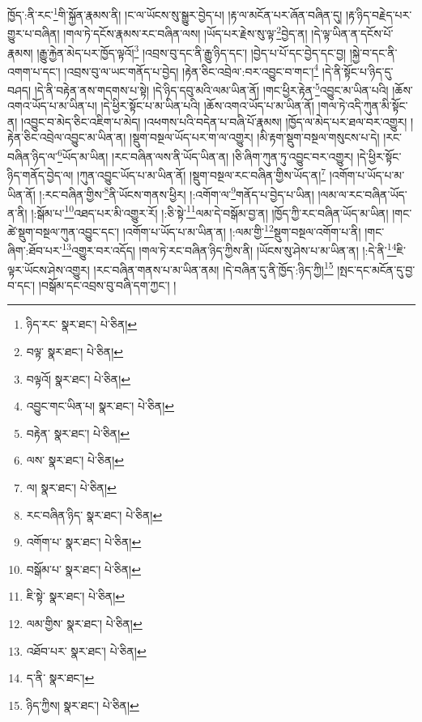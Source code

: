 ཁྱོད་:ནི་རང་\footnote{ཉིད་རང་  སྣར་ཐང་།  པེ་ཅིན། }གི་སྐྱོན་རྣམས་ནི། །ང་ལ་ཡོངས་སུ་སྒྱུར་བྱེད་པ། །རྟ་ལ་མངོན་པར་ཞོན་བཞིན་དུ། །རྟ་ཉིད་བརྗེད་པར་གྱུར་པ་བཞིན། །གལ་ཏེ་དངོས་རྣམས་རང་བཞིན་ལས། །ཡོད་པར་རྗེས་སུ་ལྟ་\footnote{བལྟ་  སྣར་ཐང་།  པེ་ཅིན། }བྱེད་ན། །དེ་ལྟ་ཡིན་ན་དངོས་པོ་རྣམས། །རྒྱུ་རྐྱེན་མེད་པར་ཁྱོད་ལྟའོ།\footnote{བལྟའོ།  སྣར་ཐང་།  པེ་ཅིན། } །འབྲས་བུ་དང་ནི་རྒྱུ་ཉིད་དང་། །བྱེད་པ་པོ་དང་བྱེད་དང་བྱ། །སྐྱེ་བ་དང་ནི་འགག་པ་དང་། །འབྲས་བུ་ལ་ཡང་གནོད་པ་བྱེད། །རྟེན་ཅིང་འབྲེལ་:བར་འབྱུང་བ་གང་།\footnote{འབྱུང་གང་ཡིན་པ།  སྣར་ཐང་།  པེ་ཅིན། } །དེ་ནི་སྟོང་པ་ཉིད་དུ་བཤད། །དེ་ནི་བརྟེན་ནས་གདགས་པ་སྟེ། །དེ་ཉིད་དབུ་མའི་ལམ་ཡིན་ནོ། །གང་ཕྱིར་རྟེན་\footnote{བརྟེན་  སྣར་ཐང་།  པེ་ཅིན། }འབྱུང་མ་ཡིན་པའི། །ཆོས་འགའ་ཡོད་པ་མ་ཡིན་པ། །དེ་ཕྱིར་སྟོང་པ་མ་ཡིན་པའི། །ཆོས་འགའ་ཡོད་པ་མ་ཡིན་ནོ། །གལ་ཏེ་འདི་ཀུན་མི་སྟོང་ན། །འབྱུང་བ་མེད་ཅིང་འཇིག་པ་མེད། །འཕགས་པའི་བདེན་པ་བཞི་པོ་རྣམས། །ཁྱོད་ལ་མེད་པར་ཐལ་བར་འགྱུར། །རྟེན་ཅིང་འབྲེལ་འབྱུང་མ་ཡིན་ན། །སྡུག་བསྔལ་ཡོད་པར་ག་ལ་འགྱུར། །མི་རྟག་སྡུག་བསྔལ་གསུངས་པ་དེ། །རང་བཞིན་ཉིད་ལ་\footnote{ལས་  སྣར་ཐང་།  པེ་ཅིན། }ཡོད་མ་ཡིན། །རང་བཞིན་ལས་ནི་ཡོད་ཡིན་ན། །ཅི་ཞིག་ཀུན་ཏུ་འབྱུང་བར་འགྱུར། །དེ་ཕྱིར་སྟོང་ཉིད་གནོད་བྱེད་ལ། །ཀུན་འབྱུང་ཡོད་པ་མ་ཡིན་ནོ། །སྡུག་བསྔལ་རང་བཞིན་གྱིས་ཡོད་ན།\footnote{ལ།  སྣར་ཐང་།  པེ་ཅིན། } །འགོག་པ་ཡོད་པ་མ་ཡིན་ནོ། །:རང་བཞིན་གྱིས་\footnote{རང་བཞིན་ཉིད་  སྣར་ཐང་།  པེ་ཅིན། }ནི་ཡོངས་གནས་ཕྱིར། །:འགོག་ལ་\footnote{འགོག་པ་  སྣར་ཐང་།  པེ་ཅིན། }གནོད་པ་བྱེད་པ་ཡིན། །ལམ་ལ་རང་བཞིན་ཡོད་ན་ནི། །:སྒོམ་པ་\footnote{བསྒོམ་པ་  སྣར་ཐང་།  པེ་ཅིན། }འཐད་པར་མི་འགྱུར་རོ། །:ཅི་སྟེ་\footnote{ཇི་སྟེ་  སྣར་ཐང་།  པེ་ཅིན། }ལམ་དེ་བསྒོམ་བྱ་ན། །ཁྱོད་ཀྱི་རང་བཞིན་ཡོད་མ་ཡིན། །གང་ཚེ་སྡུག་བསྔལ་ཀུན་འབྱུང་དང་། །འགོག་པ་ཡོད་པ་མ་ཡིན་ན། །:ལམ་གྱི་\footnote{ལམ་གྱིས་  སྣར་ཐང་།  པེ་ཅིན། }སྡུག་བསྔལ་འགོག་པ་ནི། །གང་ཞིག་:ཐོབ་པར་\footnote{འཐོབ་པར་  སྣར་ཐང་།  པེ་ཅིན། }འགྱུར་བར་འདོད། །གལ་ཏེ་རང་བཞིན་ཉིད་ཀྱིས་ནི། །ཡོངས་སུ་ཤེས་པ་མ་ཡིན་ན། །:དེ་ནི་\footnote{ད་ནི་  སྣར་ཐང་། }ཇི་ལྟར་ཡོངས་ཤེས་འགྱུར། །རང་བཞིན་གནས་པ་མ་ཡིན་ནམ། །དེ་བཞིན་དུ་ནི་ཁྱོད་:ཉིད་ཀྱི།\footnote{ཉིད་ཀྱིས།  སྣར་ཐང་།  པེ་ཅིན། } །སྤང་དང་མངོན་དུ་བྱ་བ་དང་། །བསྒོམ་དང་འབྲས་བུ་བཞི་དག་ཀྱང་། །
